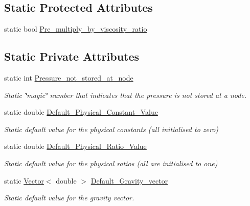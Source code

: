 \subsection*{Static Protected Attributes}
\begin{DoxyCompactItemize}
\item 
static bool \hyperlink{classoomph_1_1GeneralisedNewtonianAxisymmetricNavierStokesEquations_a0d2b47a7df1c73206016057c62729616}{Pre\+\_\+multiply\+\_\+by\+\_\+viscosity\+\_\+ratio}
\end{DoxyCompactItemize}
\subsection*{Static Private Attributes}
\begin{DoxyCompactItemize}
\item 
static int \hyperlink{classoomph_1_1GeneralisedNewtonianAxisymmetricNavierStokesEquations_a68122aa29c3b66343e04385c8f1d266b}{Pressure\+\_\+not\+\_\+stored\+\_\+at\+\_\+node}
\begin{DoxyCompactList}\small\item\em Static \char`\"{}magic\char`\"{} number that indicates that the pressure is not stored at a node. \end{DoxyCompactList}\item 
static double \hyperlink{classoomph_1_1GeneralisedNewtonianAxisymmetricNavierStokesEquations_ac1155dc74971cc635ac46849e98b104e}{Default\+\_\+\+Physical\+\_\+\+Constant\+\_\+\+Value}
\begin{DoxyCompactList}\small\item\em Static default value for the physical constants (all initialised to zero) \end{DoxyCompactList}\item 
static double \hyperlink{classoomph_1_1GeneralisedNewtonianAxisymmetricNavierStokesEquations_ac2fb6349682256ceaabf4de0c9af4089}{Default\+\_\+\+Physical\+\_\+\+Ratio\+\_\+\+Value}
\begin{DoxyCompactList}\small\item\em Static default value for the physical ratios (all are initialised to one) \end{DoxyCompactList}\item 
static \hyperlink{classoomph_1_1Vector}{Vector}$<$ double $>$ \hyperlink{classoomph_1_1GeneralisedNewtonianAxisymmetricNavierStokesEquations_a60125e630c70155032ab91c0230692b7}{Default\+\_\+\+Gravity\+\_\+vector}
\begin{DoxyCompactList}\small\item\em Static default value for the gravity vector. \end{DoxyCompactList}\end{DoxyCompactItemize}
